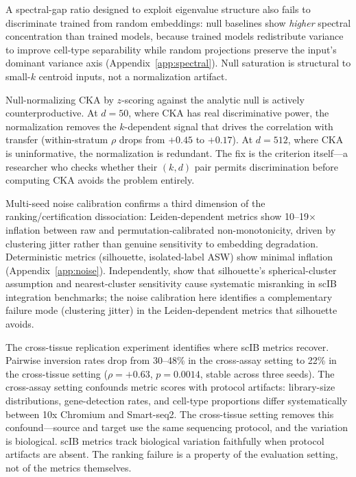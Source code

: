 \documentclass[11pt]{article}
\begin{document}
A spectral-gap ratio designed to exploit eigenvalue structure also
fails to discriminate trained from random embeddings: null baselines
show \emph{higher} spectral concentration than trained models, because
trained models redistribute variance to improve cell-type separability
while random projections preserve the input's dominant variance axis
(Appendix~\ref{app:spectral}). Null saturation is structural to
small-$k$ centroid inputs, not a normalization artifact.

Null-normalizing CKA by $z$-scoring against the analytic null is
actively counterproductive. At $d = 50$, where CKA has real
discriminative power, the normalization removes the $k$-dependent signal
that drives the correlation with transfer (within-stratum $\rho$ drops
from $+0.45$ to $+0.17$). At $d = 512$, where CKA is uninformative,
the normalization is redundant. The fix is the criterion itself---a
researcher who checks whether their $(k, d)$ pair permits discrimination
before computing CKA avoids the problem entirely.

Multi-seed noise calibration confirms a third dimension of the
ranking/certification dissociation: Leiden-dependent metrics show
10--19$\times$ inflation between raw and permutation-calibrated
non-monotonicity, driven by clustering jitter rather than genuine
sensitivity to embedding degradation. Deterministic metrics (silhouette,
isolated-label ASW) show minimal inflation
(Appendix~\ref{app:noise}). Independently,
\citet{rautenstrauch2025silhouette} show that silhouette's
spherical-cluster assumption and nearest-cluster sensitivity cause
systematic misranking in scIB integration benchmarks; the noise
calibration here identifies a complementary failure mode (clustering
jitter) in the Leiden-dependent metrics that silhouette avoids.

The cross-tissue replication experiment identifies where scIB metrics
recover. Pairwise inversion rates drop from 30--48\% in the cross-assay
setting to 22\% in the cross-tissue setting ($\rho = +0.63$,
$p = 0.0014$, stable across three seeds). The cross-assay setting
confounds metric scores with protocol artifacts: library-size
distributions, gene-detection rates, and cell-type proportions differ
systematically between 10x Chromium and Smart-seq2. The cross-tissue
setting removes this confound---source and target use the same
sequencing protocol, and the variation is biological. scIB metrics track
biological variation faithfully when protocol artifacts are absent. The
ranking failure is a property of the evaluation setting, not of the
metrics themselves.
\end{document}
